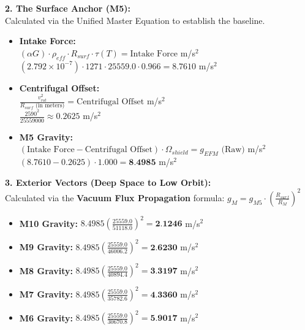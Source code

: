 \documentclass[11pt, a4paper]{article}
\begin{document}
  \vspace{1.0em}
  \noindent \textbf{2. The Surface Anchor (M5):} \\
  \hspace*{1em} Calculated via the Unified Master Equation to establish the baseline.
  \begin{itemize}
    \item \textbf{Intake Force:} \\[0.5em]
    \hspace*{2em} $(\alpha G) \cdot \rho_{eff} \cdot R_{surf} \cdot \tau(T) = \text{Intake Force}$ m/s$^2$ \\[1em]
    \hspace*{2em} $(2.792 \times 10^{-7}) \cdot 1271 \cdot 25559.0 \cdot 0.966 = 8.7610$ m/s$^2$
    
    \item \textbf{Centrifugal Offset:} \\[0.5em]
    \hspace*{2em} $\frac{v_{rot}^2}{R_{surf} \text{ (in meters)}} = \text{Centrifugal Offset}$ m/s$^2$ \\[1em]
    \hspace*{2em} $\frac{2590^2}{25559000} \approx 0.2625$ m/s$^2$
    
    \item \textbf{M5 Gravity:} \\[0.5em]
    \hspace*{2em} $(\text{Intake Force} - \text{Centrifugal Offset}) \cdot \Omega_{shield} = g_{EFM} \text{ (Raw)}$ m/s$^2$ \\[1em]
    \hspace*{2em} $(8.7610 - 0.2625) \cdot 1.000 = \textbf{8.4985}$ m/s$^2$
  \end{itemize}

  \clearpage
  \noindent \textbf{3. Exterior Vectors (Deep Space to Low Orbit):} \\
  \hspace*{1em} Calculated via the \textbf{Vacuum Flux Propagation} formula: $g_M = g_{M5} \cdot \left( \frac{R_{surf}}{R_M} \right)^2$
  \begin{itemize}
    \item \textbf{M10 Gravity:} $8.4985 \left( \frac{25559.0}{51118.0} \right)^2 = \textbf{2.1246}$ m/s$^2$
    \item \textbf{M9 Gravity:} $8.4985 \left( \frac{25559.0}{46006.2} \right)^2 = \textbf{2.6230}$ m/s$^2$
    \item \textbf{M8 Gravity:} $8.4985 \left( \frac{25559.0}{40894.4} \right)^2 = \textbf{3.3197}$ m/s$^2$
    \item \textbf{M7 Gravity:} $8.4985 \left( \frac{25559.0}{35782.6} \right)^2 = \textbf{4.3360}$ m/s$^2$
    \item \textbf{M6 Gravity:} $8.4985 \left( \frac{25559.0}{30670.8} \right)^2 = \textbf{5.9017}$ m/s$^2$
  \end{itemize}
\end{document}
